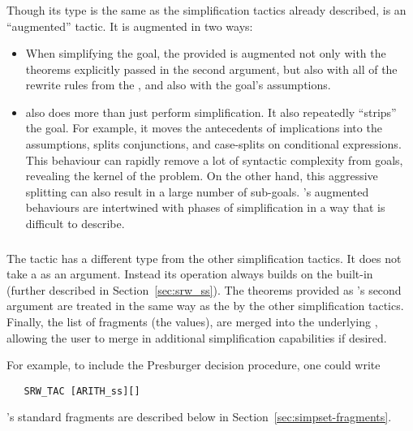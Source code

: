 \subsubsection{}

Though its type is the same as the simplification tactics already
described,  is an ``augmented'' tactic.  It is augmented
in two ways:
\begin{itemize}
\item When simplifying the goal, the provided \simpset{} is augmented
  not only with the theorems explicitly passed in the second argument,
  but also with all of the rewrite rules from the , and
  also with the goal's assumptions.
%
\item {} also does more than just perform simplification.
  It also repeatedly ``strips'' the goal.  For example, it moves the
  antecedents of implications into the assumptions, splits
  conjunctions, and case-splits on conditional expressions.  This
  behaviour can rapidly remove a lot of syntactic complexity from
  goals, revealing the kernel of the problem.  On the other hand, this
  aggressive splitting can also result in a large number of
  sub-goals.  's augmented behaviours are intertwined with
  phases of simplification in a way that is difficult to describe.
\end{itemize}

\subsubsection{}

The tactic  has a different type from the other
simplification tactics.  It does not take a \simpset{} as an
argument.  Instead its operation always builds on the built-in
\simpset{}  (further described in
Section~\ref{sec:srw_ss}).  The theorems provided as 's
second argument are treated in the same way as the by the other
simplification tactics.  Finally, the list of \simpset{} fragments
(the  values), are merged into the underlying \simpset{},
allowing the user to merge in additional simplification capabilities
if desired.

For example, to include the Presburger decision procedure, one could
write
\begin{verbatim}
   SRW_TAC [ARITH_ss][]
\end{verbatim}
\HOL's standard \simpset{} fragments are described below in
Section~\ref{sec:simpset-fragments}.


